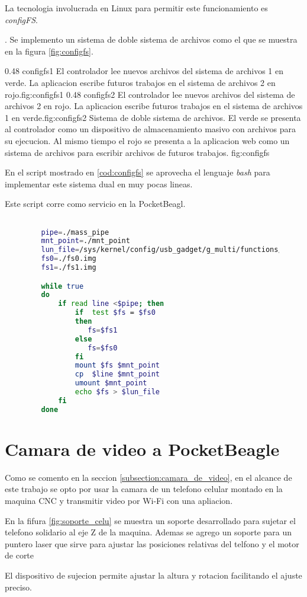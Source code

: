    La tecnologia involucrada en Linux para permitir este funcionamiento es \textit{configFS}\citep{WEBSITE:configfs}.\par.
   Se implemento un sistema de doble sistema de archivos como el que se muestra en la figura \ref{fig:configfs}.

\subfigab 
   {0.48} {configfs1} {El controlador lee nuevos archivos del sistema de archivos 1 en verde. La aplicacion escribe futuros trabajos en el sistema de archivos 2 en rojo.}{fig:configfs1}
   {0.48} {configfs2} {El controlador lee nuevos archivos del sistema de archivos 2 en rojo. La aplicacion escribe futuros trabajos en el sistema de archivos 1 en verde.}{fig:configfs2}
   {Sistema de doble sistema de archivos. El verde se presenta al controlador como un dispositivo de almacenamiento masivo con archivos para su ejecucion. Al mismo tiempo el rojo se presenta a la aplicacion web como un sistema de archivos para escribir archivos de futuros trabajos.}
   {fig:configfs}

   En el script mostrado en \ref{cod:configfs} se aprovecha el lenguaje \textit{bash} para implementar este sistema dual en muy pocas lineas.\par
   Este script corre como servicio en la PocketBeagl.

\begin{figure}[h]
   \begin{lstlisting}[language=bash,caption={Implementacion de doble sistema de archivos conectado con la tecnologia configFS. Se aprovecha la potencia del lenguaje de scripting y se corre como servicio.},label={cod:configfs}]

   pipe=./mass_pipe
   mnt_point=./mnt_point
   lun_file=/sys/kernel/config/usb_gadget/g_multi/functions/mass_storage.usb0/lun.0/file
   fs0=./fs0.img
   fs1=./fs1.img

   while true
   do
       if read line <$pipe; then
           if  test $fs = $fs0
           then
              fs=$fs1
           else
              fs=$fs0
           fi
           mount $fs $mnt_point
           cp  $line $mnt_point
           umount $mnt_point
           echo $fs > $lun_file
       fi
   done
   \end{lstlisting}
\end{figure}


\section{Camara de video a PocketBeagle}
Como se comento en la seccion \ref{subsection:camara_de_video}, en el alcance de este trabajo se opto por usar la camara de un telefono celular montado en la maquina CNC y transmitir video por Wi-Fi con una apliacion.\par
   En la fifura \ref{fig:soporte_celu} se muestra un soporte desarrollado para sujetar el telefono solidario al eje Z de la maquina. Ademas se agrego un soporte para un puntero laser que sirve para ajustar las posiciones relativas del telfono y el motor de corte\par
   El dispositivo de sujecion permite ajustar la altura y rotacion facilitando el ajuste preciso.\par

